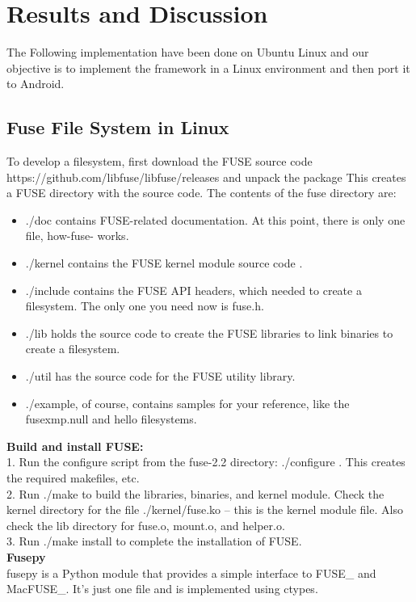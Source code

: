 \chapter{Results and Discussion}
\label{chap:results}
The Following implementation have been done on Ubuntu Linux and our objective is to implement the framework in a Linux environment and then port it to Android.

\section{Fuse File System in Linux}

To develop a filesystem, first download the FUSE source code https://github.com/libfuse/libfuse/releases  and unpack the package This creates a FUSE directory with the source code. The
contents of the fuse directory are:
\begin{itemize}
\item ./doc contains FUSE-related documentation. At this point, there is only one file, how-fuse-
works.
\item  ./kernel contains the FUSE kernel module source code .
\item  ./include contains the FUSE API headers, which  needed to create a filesystem. The only
one you need now is fuse.h.
 \item ./lib holds the source code to create the FUSE libraries to link binaries to create a filesystem.
\item ./util has the source code for the FUSE utility library.
 \item ./example, of course, contains samples for your reference, like the fusexmp.null and hello
filesystems.\\
\end{itemize}
\textbf{Build and install FUSE:}\\
1. Run the configure script from the fuse-2.2 directory: ./configure . This creates the required
makefiles, etc.\\
2. Run ./make to build the libraries, binaries, and kernel module. Check the kernel directory for
the file ./kernel/fuse.ko -- this is the kernel module file. Also check the lib directory for fuse.o,
mount.o, and helper.o.\\
3. Run ./make install to complete the installation of FUSE.\\

\textbf{Fusepy}\\
fusepy is a Python module that provides a simple interface to FUSE\_ and
MacFUSE\_. It's just one file and is implemented using ctypes.
